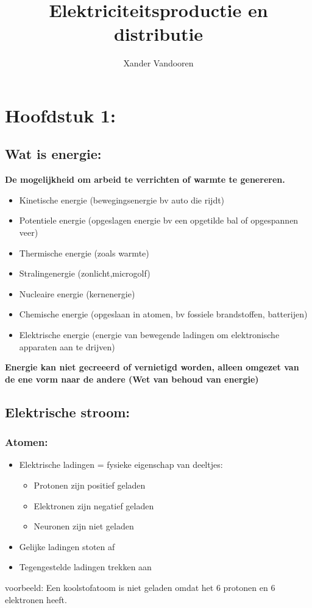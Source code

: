 \documentclass[12pt]{article}
\begin{document}
\begin{titlepage}
    \author{Xander Vandooren}
    \title{Elektriciteitsproductie en distributie}
\end{titlepage}
\maketitle
\newpage
\tableofcontents
\newpage
{}
\section{Hoofdstuk 1:}
\subsection{Wat is energie:}
\textbf{De mogelijkheid om arbeid te verrichten of warmte te genereren.}
\begin{itemize}
    \item Kinetische energie (bewegingsenergie bv auto die rijdt)
    \item Potentiele energie (opgeslagen energie bv een opgetilde bal of opgespannen veer)
    \item Thermische energie (zoals warmte)
    \item Stralingenergie (zonlicht,microgolf)
    \item Nucleaire energie (kernenergie)
    \item Chemische energie (opgeslaan in atomen, bv fossiele brandstoffen, batterijen)
    \item Elektrische energie (energie van bewegende ladingen om elektronische apparaten aan te drijven)
\end{itemize}
\textbf{Energie kan niet gecreeerd of vernietigd worden, alleen omgezet van de ene vorm naar de andere (Wet van behoud van energie)}
\subsection{Elektrische stroom:}
\subsubsection{\textbf{Atomen:}}
\begin{itemize}
    \item Elektrische ladingen = fysieke eigenschap van deeltjes:\begin{itemize}
        \item Protonen zijn positief geladen
        \item Elektronen zijn negatief geladen
        \item Neuronen zijn niet geladen
    \end{itemize}
    \item Gelijke ladingen stoten af
    \item Tegengestelde ladingen trekken aan
\end{itemize}
voorbeeld: Een koolstofatoom is niet geladen omdat het 6 protonen en 6 elektronen heeft.
\end{document}
